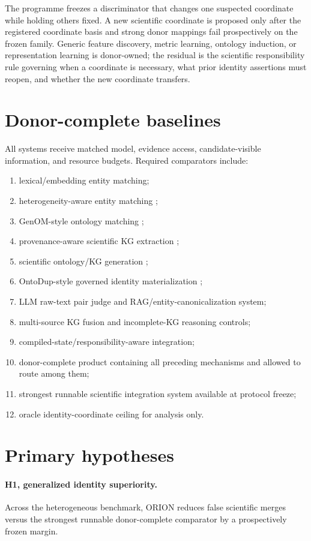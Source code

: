 \documentclass[11pt]{article}
\begin{document}
The programme freezes a discriminator that changes one suspected coordinate while holding others fixed. A new scientific coordinate is proposed only after the registered coordinate basis and strong donor mappings fail prospectively on the frozen family. Generic feature discovery, metric learning, ontology induction, or representation learning is donor-owned; the residual is the scientific responsibility rule governing when a coordinate is necessary, what prior identity assertions must reopen, and whether the new coordinate transfers.

\section{Donor-complete baselines}
All systems receive matched model, evidence access, candidate-visible information, and resource budgets. Required comparators include:
\begin{enumerate}
    \item lexical/embedding entity matching;
    \item heterogeneity-aware entity matching \cite{heterogeneity2026};
    \item GenOM-style ontology matching \cite{genom2026};
    \item provenance-aware scientific KG extraction \cite{scigraphllm2026};
    \item scientific ontology/KG generation \cite{oarga2026};
    \item OntoDup-style governed identity materialization \cite{ontodup2026};
    \item LLM raw-text pair judge and RAG/entity-canonicalization system;
    \item multi-source KG fusion and incomplete-KG reasoning controls;
    \item compiled-state/responsibility-aware integration;
    \item donor-complete product containing all preceding mechanisms and allowed to route among them;
    \item strongest runnable scientific integration system available at protocol freeze;
    \item oracle identity-coordinate ceiling for analysis only.
\end{enumerate}

\section{Primary hypotheses}
\paragraph{H1, generalized identity superiority.}
Across the heterogeneous benchmark, ORION reduces false scientific merges versus the strongest runnable donor-complete comparator by a prospectively frozen margin.
\end{document}
